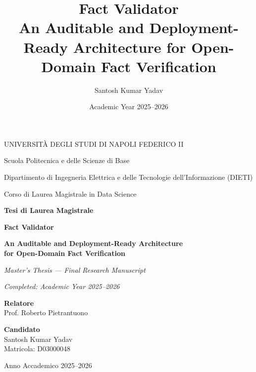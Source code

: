 \documentclass[12pt,a4paper,openany]{report}
\title{Fact Validator\\ \large An Auditable and Deployment-Ready Architecture for Open-Domain Fact Verification}
\author{Santosh Kumar Yadav}
\date{Academic Year 2025--2026}
\begin{document}
\hypersetup{pageanchor=false}

\begin{titlepage}
\centering
{\large UNIVERSIT\`A DEGLI STUDI DI NAPOLI FEDERICO II\par}
\vspace{0.15cm}
{\normalsize Scuola Politecnica e delle Scienze di Base\par}
\vspace{0.1cm}
{\normalsize Dipartimento di Ingegneria Elettrica e delle Tecnologie dell'Informazione (DIETI)\par}
\vspace{0.1cm}
{\normalsize Corso di Laurea Magistrale in Data Science\par}
\vspace{1.2cm}


{\Large \textbf{Tesi di Laurea Magistrale}\par}
\vspace{0.9cm}
{\LARGE \textbf{Fact Validator}\par}
\vspace{0.4cm}
{\Large \textbf{An Auditable and Deployment-Ready Architecture\\for Open-Domain Fact Verification}\par}
\vspace{0.6cm}
{\normalsize\itshape Master's Thesis --- Final Research Manuscript\par}
{\normalsize\itshape Completed: Academic Year 2025--2026\par}
\vfill
\begin{minipage}[t]{0.48\textwidth}
\raggedright
\textbf{Relatore}\\
Prof. Roberto Pietrantuono
\end{minipage}
\hfill
\begin{minipage}[t]{0.48\textwidth}
\raggedleft
\textbf{Candidato}\\
Santosh Kumar Yadav\\
Matricola: D03000048
\end{minipage}
\vfill
{\normalsize Anno Accademico 2025--2026\par}
\end{titlepage}

\clearpage
\thispagestyle{empty}
\null
\clearpage

\hypersetup{pageanchor=true}
\end{document}
